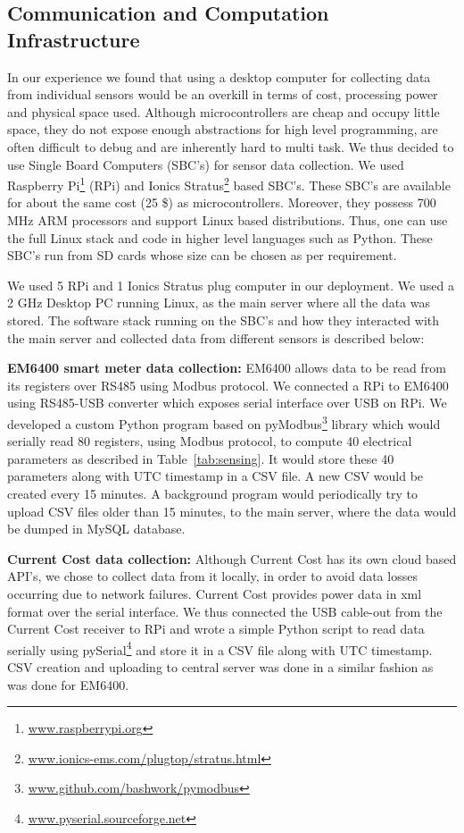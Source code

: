 \documentclass[10pt]{sensys-proc}
\newcommand{\tabref}[1]{Table~\ref{#1}}
\begin{document}
\subsection{Communication and Computation Infrastructure}
In our experience we found that using a desktop computer for collecting data from individual sensors would be an overkill in terms of cost, processing power and physical space used. Although microcontrollers are cheap and occupy little space, they do not expose enough abstractions for high level programming, are often difficult to debug and are inherently hard to multi task. We thus decided to use Single Board Computers (SBC's) for sensor data collection. We used Raspberry Pi\footnote{\url{www.raspberrypi.org}} (RPi) and Ionics Stratus\footnote{\url{www.ionics-ems.com/plugtop/stratus.html}} based SBC's. These SBC's are available for about the same cost (25 \$) as microcontrollers. Moreover, they possess 700 MHz ARM processors and support Linux based distributions. Thus, one can use the full Linux stack and code in higher level languages such as Python. These SBC's run from SD cards whose size can be chosen as per requirement. 

We used 5 RPi and 1 Ionics Stratus plug computer in our deployment. We used a 2 GHz Desktop PC running Linux, as the main server where all the data was stored. The software stack running on the SBC's and how they interacted with the main server and collected data from different sensors is described below:

\noindent \textbf{EM6400 smart meter data collection:} EM6400 allows data to be read from its registers over RS485 using Modbus protocol. We connected a RPi to EM6400 using RS485-USB converter which exposes serial interface over USB on RPi. We developed a custom Python program based on pyModbus\footnote{\url{www.github.com/bashwork/pymodbus}} library which would serially read 80 registers, using Modbus protocol, to compute 40 electrical parameters as described in \tabref{tab:sensing}. It would store these 40 parameters along with UTC timestamp in a CSV file. A new CSV would be created every 15 minutes. A background program would periodically try to upload CSV files older than 15 minutes, to the main server, where the data would be dumped in MySQL database.

\noindent \textbf{Current Cost data collection:} Although Current Cost has its own cloud based API's, we chose to collect data from it locally, in order to avoid data losses occurring due to network failures. Current Cost provides power data in xml format over the serial interface. We thus connected the USB cable-out from the Current Cost receiver to RPi and wrote a simple Python script to read data serially using pySerial\footnote{\url{www.pyserial.sourceforge.net}} and store it in a CSV file along with UTC timestamp. CSV creation and uploading to central server was done in a similar fashion as was done for EM6400.
\end{document}
